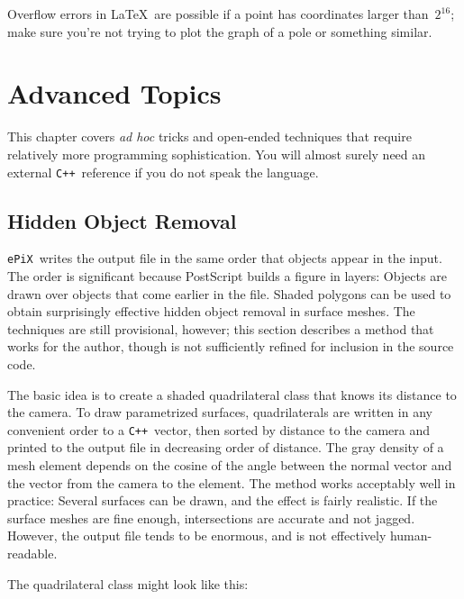 \documentclass[12pt]{report}
\newcommand{\code}[1]{\texttt{#1}}
\newcommand{\ePiX}{\code{ePiX}}
\newcommand{\CXX}{\code{C++}}
\begin{document}
Overflow errors in \LaTeX\ are possible if a point has coordinates
larger than~$2^{16}$; make sure you're not trying to plot the graph of
a pole or something similar.


\chapter{Advanced Topics}
\label{chapter:adv}

This chapter covers \emph{ad hoc} tricks and open-ended techniques
that require relatively more programming sophistication. You will
almost surely need an external \CXX\ reference if you do not speak the
language.


\section{Hidden Object Removal}

\ePiX\ writes the output file in the same order that objects appear in
the input. The order is significant because PostScript builds a figure
in layers: Objects are drawn over objects that come earlier in the
file. Shaded polygons can be used to obtain surprisingly effective
hidden object removal in surface meshes. The techniques are still
provisional, however; this section describes a method that works for
the author, though is not sufficiently refined for inclusion in the
source code.

The basic idea is to create a shaded quadrilateral class that knows
its distance to the camera. To draw parametrized
surfaces, quadrilaterals are written in any convenient order to a
\CXX\ vector, then sorted by distance to the camera and printed to the
output file in decreasing order of distance. The gray density of a
mesh element depends on the cosine of the angle between the normal
vector and the vector from the camera to the element. The method works
acceptably well in practice: Several surfaces can be drawn, and the
effect is fairly realistic. If the surface meshes are fine enough,
intersections are accurate and not jagged. However, the output file
tends to be enormous, and is not effectively human-readable.

The quadrilateral class might look like this:
\end{document}
